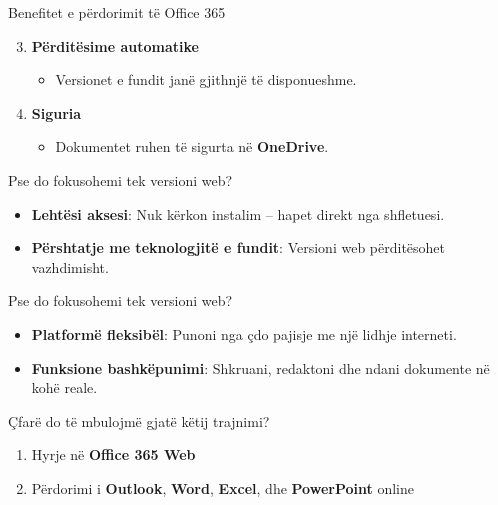 \documentclass[
  ignorenonframetext,
]{beamer}
\providecommand{\tightlist}{%
  \setlength{\itemsep}{0pt}\setlength{\parskip}{0pt}}
\begin{document}
\begin{frame}{Benefitet e përdorimit të Office 365}
\label{benefitet-e-puxebrdorimit-tuxeb-office-365-1}
\begin{enumerate}
\setcounter{enumi}{2}
\item
  \textbf{Përditësime automatike}

  \begin{itemize}
  \tightlist
  \item
    Versionet e fundit janë gjithnjë të disponueshme.
  \end{itemize}
\item
  \textbf{Siguria}

  \begin{itemize}
  \tightlist
  \item
    Dokumentet ruhen të sigurta në \textbf{OneDrive}.
  \end{itemize}
\end{enumerate}
\end{frame}

\begin{frame}{Pse do fokusohemi tek versioni web?}
\label{pse-do-fokusohemi-tek-versioni-web}
\begin{itemize}
\item
  \textbf{Lehtësi aksesi}: Nuk kërkon instalim -- hapet direkt nga
  shfletuesi.
\item
  \textbf{Përshtatje me teknologjitë e fundit}: Versioni web
  përditësohet vazhdimisht.
\end{itemize}
\end{frame}

\begin{frame}{Pse do fokusohemi tek versioni web?}
\label{pse-do-fokusohemi-tek-versioni-web-1}
\begin{itemize}
\item
  \textbf{Platformë fleksibël}: Punoni nga çdo pajisje me një lidhje
  interneti.
\item
  \textbf{Funksione bashkëpunimi}: Shkruani, redaktoni dhe ndani
  dokumente në kohë reale.
\end{itemize}
\end{frame}

\begin{frame}{Çfarë do të mbulojmë gjatë këtij trajnimi?}
\label{uxe7faruxeb-do-tuxeb-mbulojmuxeb-gjatuxeb-kuxebtij-trajnimi}
\begin{enumerate}
\item
  Hyrje në \textbf{Office 365 Web}
\item
  Përdorimi i \textbf{Outlook}, \textbf{Word}, \textbf{Excel}, dhe
  \textbf{PowerPoint} online
\end{enumerate}
\end{frame}
\end{document}
